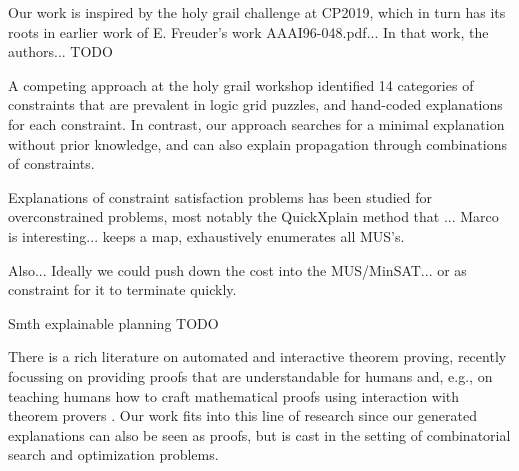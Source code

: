 Our work is inspired by the holy grail challenge at CP2019, which in turn has its roots in earlier work of E. Freuder's work \cite{}AAAI96-048.pdf... In that work, the authors... TODO

A competing approach at the holy grail workshop \cite{} identified 14 categories of constraints that are prevalent in logic grid puzzles, and hand-coded explanations for each constraint. In contrast, our approach searches for a minimal explanation without prior knowledge, and can also explain propagation through combinations of constraints.

Explanations of constraint satisfaction problems has been studied for overconstrained problems, most notably the QuickXplain method \cite{} that ...
Marco is interesting... keeps a map, exhaustively enumerates all MUS's.

Also...  Ideally we could push down the cost into the MUS/MinSAT... or as constraint for it to terminate quickly.

Smth explainable planning TODO



There is a rich literature on automated and interactive theorem proving, recently focussing on providing proofs that are understandable for humans \cite{Ganesalingam2017} and, e.g.,  on teaching humans how to craft mathematical proofs using interaction with theorem provers \cite{DBLP:conf/icml/YangD19}. 
Our work fits into this line of research since our generated explanations can also be seen as proofs, but is cast in the setting of combinatorial search and optimization problems.
